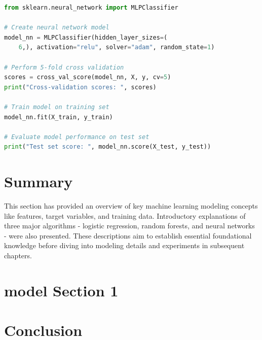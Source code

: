 \begin{lstlisting}[language=Python]
from sklearn.neural_network import MLPClassifier

# Create neural network model
model_nn = MLPClassifier(hidden_layer_sizes=(
	6,), activation="relu", solver="adam", random_state=1)

# Perform 5-fold cross validation
scores = cross_val_score(model_nn, X, y, cv=5)
print("Cross-validation scores: ", scores)

# Train model on training set
model_nn.fit(X_train, y_train)

# Evaluate model performance on test set
print("Test set score: ", model_nn.score(X_test, y_test))

\end{lstlisting}

\section{Summary}

This section has provided an overview of key machine learning modeling concepts like features, target variables, and training data. Introductory explanations of three major algorithms - logistic regression, random forests, and neural networks - were also presented. These descriptions aim to establish essential foundational knowledge before diving into modeling details and experiments in subsequent chapters.


\section{model Section 1}
\label{sec:model:sec1}



\section{Conclusion}
\label{sec:model:conclusion}



